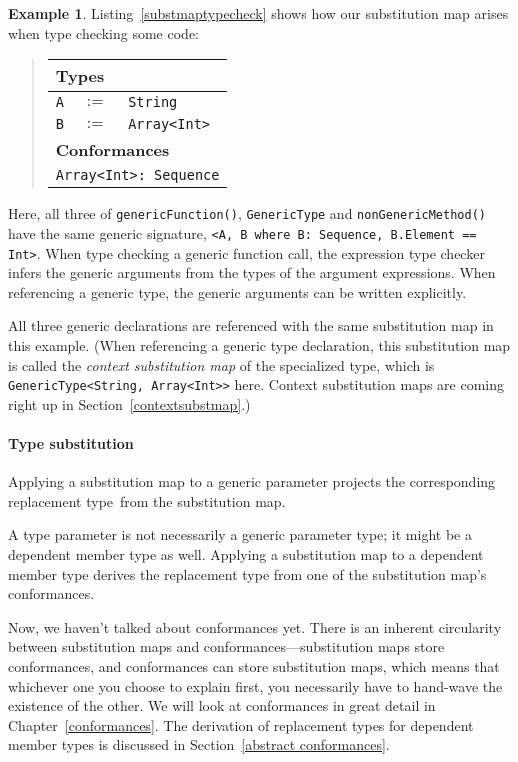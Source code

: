 \documentclass[a4paper,headsepline,bibliography=totoc,toc=flat,fleqn,twoside=semi]{scrbook}
\theoremstyle{definition}
\theoremstyle{definition}
\newtheorem{example}{Example}[chapter]
\theoremstyle{definition}
\newcommand{\SubMapC}[2]{\begin{tabular}{|lll|}
\hline
\multicolumn{3}{|l|}{\textbf{Types}}\\
\hline
#1\\
\hline
\hline
\multicolumn{3}{|l|}{\textbf{Conformances}}\\
\hline
#2\\
\hline
\end{tabular}}
\newcommand{\SubType}[2]{\texttt{#1}&$:=$&\texttt{#2}}
\newcommand{\SubConf}[1]{\multicolumn{3}{|l|}{\texttt{#1}}}
\begin{document}
\begin{example}
Listing~\ref{substmaptypecheck} shows how our substitution map arises when type checking some code:
\begin{quote}
\SubMapC{
\SubType{A}{String}\\
\SubType{B}{Array<Int>}
}{
\SubConf{Array<Int>:\ Sequence}
}
\end{quote}
Here, all three of \texttt{genericFunction()}, \texttt{GenericType} and \texttt{nonGenericMethod()} have the same generic signature, \texttt{<A, B where B:~Sequence, B.Element == Int>}. When type checking a generic function call, the expression type checker infers the generic arguments from the types of the argument expressions. When referencing a generic type, the generic arguments can be written explicitly.

All three generic declarations are referenced with the same substitution map in this example. (When referencing a generic type declaration, this substitution map is called the \emph{context substitution map} of the specialized type, which is \texttt{GenericType<String, Array<Int>>} here. Context substitution maps are coming right up in Section~\ref{contextsubstmap}.)
\end{example}

\paragraph{Type substitution} 
Applying a substitution map to a generic parameter projects the corresponding replacement type from the substitution map.

A type parameter is not necessarily a generic parameter type; it might be a dependent member type as well. Applying a substitution map to a dependent member type derives the replacement type from one of the substitution map's conformances.

Now, we haven't talked about conformances yet. There is an inherent circularity between substitution maps and conformances---substitution maps store conformances, and conformances can store substitution maps, which means that whichever one you choose to explain first, you necessarily have to hand-wave the existence of the other. We will look at conformances in great detail in Chapter~\ref{conformances}. The derivation of replacement types for dependent member types is discussed in Section~\ref{abstract conformances}.
\end{document}
